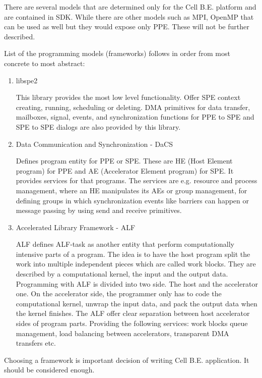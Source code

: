 \par
There are several models that are determined only for the Cell B.E. platform and are contained in SDK.
While there are other models such as MPI, OpenMP that can be used as well but they would expose only PPE.
These will not be further described.

List of the programming models (frameworks) follows in order from most concrete to most abstract:
\begin{enumerate}
\item {libspe2}
\par
This library provides the most low level functionality.
Offer SPE context creating, running, scheduling or deleting.
DMA primitives for data transfer, mailboxes, signal, events, and synchronization functions for PPE to SPE and SPE to SPE dialogs are also provided by this library.

\item {Data Communication and Synchronization - DaCS}
\par
Defines program entity for PPE or SPE.
These are HE (Host Element program) for PPE and AE (Accelerator Element program) for SPE.
It provides services for that programs.
The services are e.g. resource and process management, where an HE manipulates its AEs or group management, for defining groups in which synchronization events like barriers can happen or message passing by using send and receive primitives.

\item {Accelerated Library Framework - ALF}
\par
ALF defines ALF-task as another entity that perform computationally intensive parts of a program.
The idea is to have the host program split the work into multiple independent pieces which are called work blocks.
They are described by a computational kernel, the input and the output data.
Programming with ALF is divided into two side.
The host and the accelerator one.
On the accelerator side, the programmer only has to code the computational kernel, unwrap the input data, and pack the output data when the kernel finishes.
The ALF offer clear separation between host accelerator sides of program parts.
Providing the following services: work blocks queue management, load balancing between accelerators, transparent DMA transfers etc.

\end{enumerate}

Choosing a framework is important decision of writing Cell B.E. application.
It should be considered enough.

